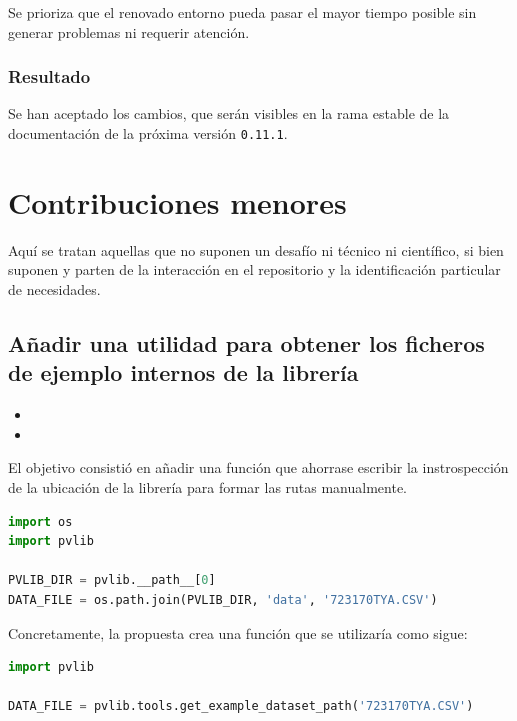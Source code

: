 Se prioriza que el renovado entorno pueda pasar el mayor tiempo posible sin generar problemas ni requerir atención.

\subsubsection{Resultado}

Se han aceptado los cambios, que serán visibles en la rama estable de la documentación de la próxima versión \texttt{0.11.1}.

\section{Contribuciones menores} \label{sct:desarrollo:contribuciones_menores}

Aquí se tratan aquellas que no suponen un desafío ni técnico ni científico, si bien suponen y parten de la interacción en el repositorio y la identificación particular de necesidades.

\subsection{Añadir una utilidad para obtener los ficheros de ejemplo internos de la librería}

\begin{itemize}
    \item {}
    \item {}
\end{itemize}

El objetivo consistió en añadir una función que ahorrase escribir la instrospección de la ubicación de la librería para formar las rutas manualmente.

\begin{lstlisting}[language=python, caption={Fragmento de código utilizado normalmente para obtener la ruta de los ficheros de la librería}, label={lst:example_files_current}]
import os
import pvlib

PVLIB_DIR = pvlib.__path__[0]
DATA_FILE = os.path.join(PVLIB_DIR, 'data', '723170TYA.CSV')
\end{lstlisting}

Concretamente, la propuesta crea una función que se utilizaría como sigue:

\begin{lstlisting}[language=python, caption={Fragmento de código utilizando la función propuesta para obtener la ruta de los ficheros de la librería}, label={lst:example_files_proposal}]
import pvlib

DATA_FILE = pvlib.tools.get_example_dataset_path('723170TYA.CSV')
\end{lstlisting}

